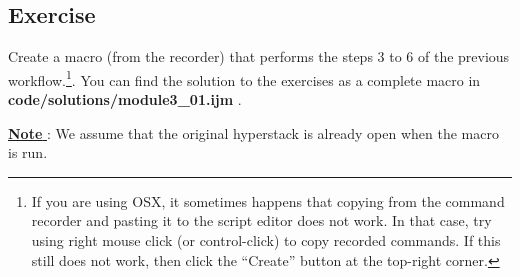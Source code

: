 

\subsection{Exercise }
Create a macro (from the recorder) that performs the steps 3 to 6 of the previous workflow.\footnote{If you are using OSX, it sometimes happens that copying from the command recorder and pasting it to the script editor does not work. In that case, try using right mouse click (or control-click) to copy recorded commands. If this still does not work, then click the ``Create'' button at the top-right corner.}. You can find the solution to the exercises as a complete macro in \textbf{code/solutions/module3\_01.ijm} .

\underline{\textbf{Note} }: We assume that the original hyperstack is already open when the macro is run.